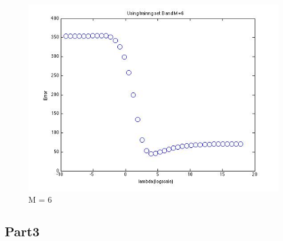 \begin{figure}[!htb]
  \includegraphics[width=\linewidth]{figures/p3_regressB_m=6}
  \caption{M = 6}\label{fig:figures/p3_regressB_m=6}
\endminipage
\end{figure}


\subsection{Part3}
